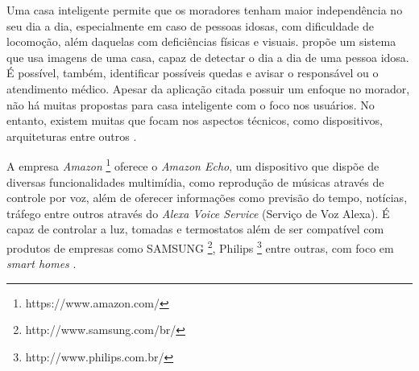


Uma casa inteligente permite que os moradores tenham maior independência no seu dia a dia, especialmente em caso de pessoas idosas, com dificuldade de locomoção, além daquelas com deficiências físicas e visuais.
 propõe um sistema que usa imagens de uma casa, capaz de detectar o dia a dia de uma pessoa idosa. É possível, também, identificar possíveis quedas e avisar o responsável ou o atendimento médico. Apesar da aplicação citada possuir um enfoque no morador, não há muitas propostas para casa inteligente com o foco nos usuários. No entanto, existem muitas que focam nos aspectos técnicos, como dispositivos, arquiteturas entre outros \cite{Wilson2015}.





A empresa \textit{Amazon} \textsuperscript{\textregistered}
\footnote{https://www.amazon.com/} oferece o \textit{Amazon Echo}, um dispositivo que dispõe de diversas funcionalidades multimídia, como reprodução de músicas através de controle por voz, além de oferecer informações como previsão do tempo, notícias, tráfego entre outros através do \textit{Alexa Voice Service} (Serviço de Voz Alexa). É capaz de controlar a luz, tomadas e termostatos além de ser compatível com produtos de empresas como SAMSUNG\textsuperscript{\textregistered}
\footnote{http://www.samsung.com/br/}, Philips\textsuperscript{\textregistered}
\footnote{http://www.philips.com.br/} entre outras, com foco em \textit{smart homes} \cite{amazon2017}.

